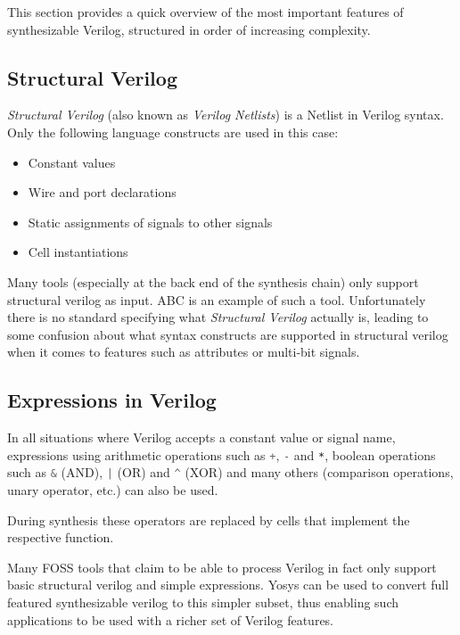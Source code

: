 This section provides a quick overview of the most important features of
synthesizable Verilog, structured in order of increasing complexity.

\subsection{Structural Verilog}

{\it Structural Verilog} (also known as {\it Verilog Netlists}) is a Netlist in
Verilog syntax. Only the following language constructs are used in this case:

\begin{itemize}
\item Constant values
\item Wire and port declarations
\item Static assignments of signals to other signals
\item Cell instantiations
\end{itemize}

Many tools (especially at the back end of the synthesis chain) only support
structural verilog as input. ABC is an example of such a tool. Unfortunately
there is no standard specifying what {\it Structural Verilog} actually is,
leading to some confusion about what syntax constructs are supported in
structural verilog when it comes to features such as attributes or multi-bit
signals.

\subsection{Expressions in Verilog}

In all situations where Verilog accepts a constant value or signal name,
expressions using arithmetic operations such as
\lstinline[language=Verilog]{+}, \lstinline[language=Verilog]{-} and \lstinline[language=Verilog]{*},
boolean operations such as
\lstinline[language=Verilog]{&} (AND), \lstinline[language=Verilog]{|} (OR) and \lstinline[language=Verilog]{^} (XOR)
and many others (comparison operations, unary operator, etc.) can also be used.

During synthesis these operators are replaced by cells that implement the respective function.

Many FOSS tools that claim to be able to process Verilog in fact only support
basic structural verilog and simple expressions. Yosys can be used to convert
full featured synthesizable verilog to this simpler subset, thus enabling such
applications to be used with a richer set of Verilog features.

